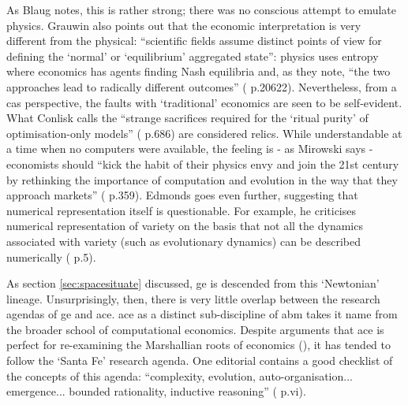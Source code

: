 As Blaug notes, this is rather strong; there was no conscious attempt to emulate physics. Grauwin also points out that the economic interpretation is very different from the physical: ``scientific fields assume distinct points of view for defining the `normal' or `equilibrium' aggregated state'': physics uses entropy where economics has agents finding Nash equilibria and, as they note, ``the two approaches lead to radically different outcomes'' (\citealt{grauwin_competition_2009} p.20622). Nevertheless, from a \gls{cas} perspective, the faults with `traditional' economics are seen to be self-evident. What Conlisk calls the ``strange sacrifices required for the `ritual purity' of optimisation-only models'' (\citealt{conlisk_why_1996} p.686) are considered relics. While understandable at a time when no computers were available, the feeling is - as Mirowski says - economists should ``kick the habit of their physics envy and join the 21st century by rethinking the importance of computation and evolution in the way that they approach markets'' (\citealt{mirowski_kicking_2007} p.359). Edmonds goes even further, suggesting that numerical representation itself is questionable. For example, he criticises numerical representation of variety on the basis that not all the dynamics associated with variety (such as evolutionary dynamics) can be described numerically (\citealt{edmonds_against_2004} p.5).

As section \ref{sec:spacesituate} discussed, \gls{ge} is descended from this `Newtonian' lineage. Unsurprisingly, then, there is very little overlap between the research agendas of \gls{ge} and \gls{ace}. \gls{ace} as a distinct sub-discipline of \gls{abm} takes it name from the broader school of computational economics. Despite arguments that \gls{ace} is perfect for re-examining the Marshallian roots of economics (\citealt{leijonhufvud_agent-based_2006}), it has tended to follow the `Santa Fe' research agenda. One editorial contains a good checklist of the concepts of this agenda: ``complexity, evolution, auto-organisation... emergence... bounded rationality, inductive reasoning'' (\citealt{consiglio_artificial_2007} p.vi).  

